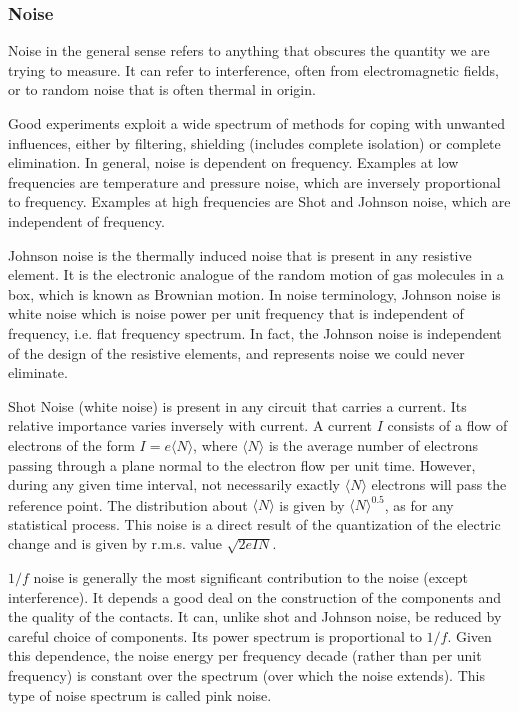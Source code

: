\documentclass[a4paper]{article}
\begin{document}
\subsubsection*{Noise~\cite{squires_2001,dunlap1988experimental}}
\begin{defi}[Noise]
Noise in the general sense refers to anything that obscures the quantity we are trying to measure. It can refer to interference, often from electromagnetic fields, or to random noise that is often thermal in origin.
\end{defi}
\begin{Note}
Good experiments exploit a wide spectrum of methods for coping with unwanted influences, either by filtering, shielding (includes complete isolation) or complete elimination. In general, noise is dependent on frequency. Examples at low frequencies are temperature and pressure noise, which are inversely proportional to frequency. Examples at high frequencies are Shot and Johnson noise, which are independent of frequency. 
\end{Note}
\begin{defi}
Johnson noise is the thermally induced noise that is present in any resistive element. It is the electronic analogue of the random motion of gas molecules in a box, which is known as Brownian motion. In noise terminology, Johnson noise is white noise which is noise power per unit frequency that is independent of frequency, i.e. flat frequency spectrum. In fact, the Johnson noise is independent of the design of the resistive elements, and represents noise we could never eliminate.
\end{defi}
\begin{defi}
Shot Noise (white noise) is present in any circuit that carries a current. Its relative importance varies inversely with current. A current $I$ consists of a flow of electrons of the form $I=e\langle N\rangle$, where $\langle N\rangle$ is the average number of electrons passing through a plane normal to the electron flow per unit time. However, during any given time interval, not necessarily exactly $\langle N\rangle$ electrons will pass the reference point. The distribution about $\langle N\rangle$ is given by $\langle N\rangle^{0.5}$, as for any statistical process. This noise is a direct result of the quantization of the electric change and is given by r.m.s. value $\sqrt{2eIN}$. 
\end{defi}
\begin{defi}[1/f Noise]
$1/f$ noise is generally the most significant contribution to the noise (except interference). It depends a good deal on the construction of the components and the quality of the contacts. It can, unlike shot and Johnson noise, be reduced by careful choice of components. Its power spectrum is proportional to $1/f$. Given this dependence, the noise energy per frequency decade (rather than per unit frequency) is constant over the spectrum (over which the noise extends). This type of noise spectrum is called pink noise.
\end{defi}
\end{document}
